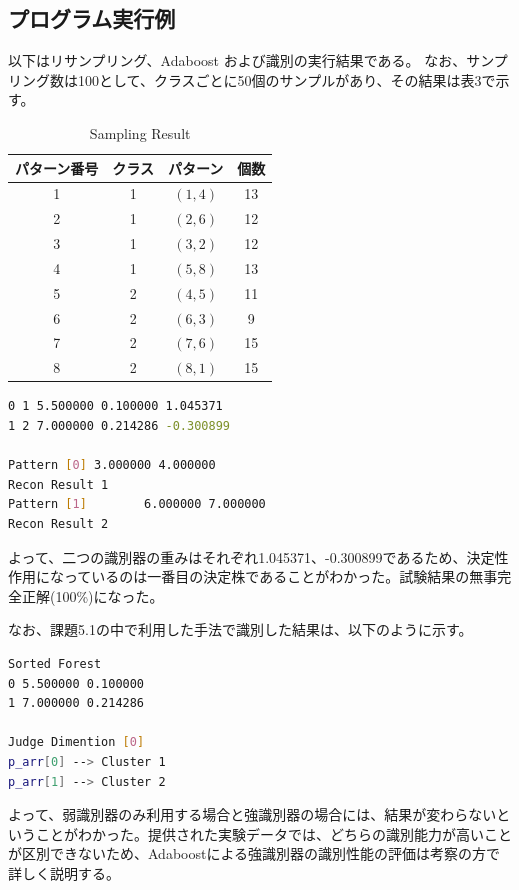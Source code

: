 \documentclass[ %
  uplatex,%
  papersize%
]{jsarticle}
\begin{document}
\subsection{プログラム実行例}
以下はリサンプリング、Adaboost および識別の実行結果である。
なお、サンプリング数は100として、クラスごとに50個のサンプルがあり、その結果は表3で示す。
\newpage

\begin{table}[h]\footnotesize
\caption{Sampling Result}
\label{}
\centering
\begin{tabular}{|c|c|c|c|}
\hline
パターン番号&クラス&パターン&個数\\
\hline
1 & 1 &$(1, 4)$ &13\\
\hline
2 & 1 &$(2, 6)$ &12\\
\hline
3 & 1 &$(3, 2)$ &12\\
\hline
4 & 1 &$(5, 8)$ &13\\
\hline
5 & 2 &$(4, 5)$ &11\\
\hline
6 & 2 &$(6, 3)$ &9\\
\hline
7 & 2 &$(7, 6)$ &15\\
\hline
8 & 2 &$(8, 1)$ &15\\
\hline
\end{tabular} 
\end{table}

\begin{lstlisting}[language=bash,caption=Adaboost and Recognition]
0 1 5.500000 0.100000 1.045371
1 2 7.000000 0.214286 -0.300899

Pattern [0]	3.000000 4.000000
Recon Result 1
Pattern [1]	       6.000000 7.000000
Recon Result 2
\end{lstlisting}

よって、二つの識別器の重みはそれぞれ1.045371、-0.300899であるため、決定性作用になっているのは一番目の決定株であることがわかった。試験結果の無事完全正解(100\%)になった。

なお、課題5.1の中で利用した手法で識別した結果は、以下のように示す。

\begin{lstlisting}[language=bash,caption=Decetion Stump Result]
Sorted Forest
0 5.500000 0.100000
1 7.000000 0.214286

Judge Dimention [0]
p_arr[0] --> Cluster 1 
p_arr[1] --> Cluster 2 
\end{lstlisting}
よって、弱識別器のみ利用する場合と強識別器の場合には、結果が変わらないということがわかった。提供された実験データでは、どちらの識別能力が高いことが区別できないため、Adaboostによる強識別器の識別性能の評価は考察の方で詳しく説明する。
\end{document}
